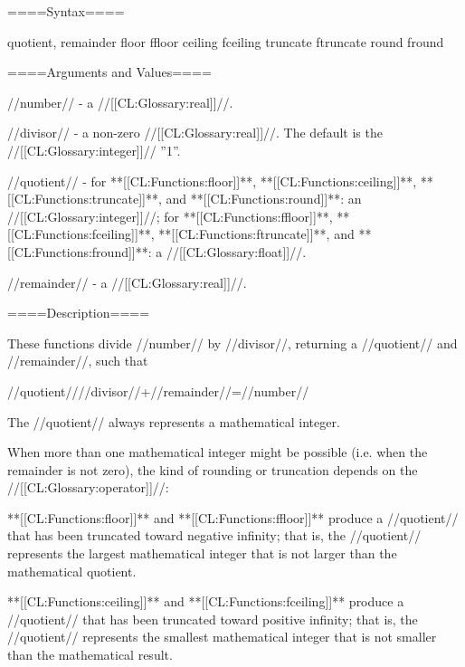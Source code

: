 
====Syntax====

 {quotient, remainder} {floor ffloor ceiling fceiling truncate ftruncate round fround}

====Arguments and Values====

//number// - a //[[CL:Glossary:real]]//.

//divisor// - a non-zero //[[CL:Glossary:real]]//. The default is the //[[CL:Glossary:integer]]// ''1''.

//quotient// - for **[[CL:Functions:floor]]**, **[[CL:Functions:ceiling]]**, **[[CL:Functions:truncate]]**, and **[[CL:Functions:round]]**: an //[[CL:Glossary:integer]]//; for **[[CL:Functions:ffloor]]**, **[[CL:Functions:fceiling]]**, **[[CL:Functions:ftruncate]]**, and **[[CL:Functions:fround]]**: a //[[CL:Glossary:float]]//.

//remainder// - a //[[CL:Glossary:real]]//.

====Description====

These functions divide //number// by //divisor//, returning a //quotient// and //remainder//, such that

\quad//quotient//\centerdot //divisor//+//remainder//=//number//

The //quotient// always represents a mathematical integer.

When more than one mathematical integer might be possible (i.e. when the remainder is not zero), the kind of rounding or truncation depends on the //[[CL:Glossary:operator]]//:

\beginlist


**[[CL:Functions:floor]]** and **[[CL:Functions:ffloor]]** produce a //quotient// that has been truncated toward negative infinity; that is, the //quotient// represents the largest mathematical integer that is not larger than the mathematical quotient.


**[[CL:Functions:ceiling]]** and **[[CL:Functions:fceiling]]** produce a //quotient// that has been truncated toward positive infinity; that is, the //quotient// represents the smallest mathematical integer that is not smaller than the mathematical result.

